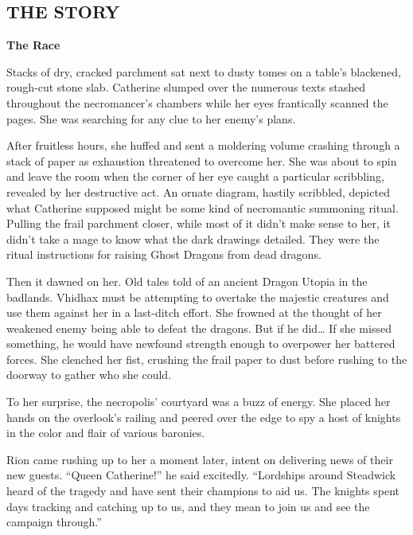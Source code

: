 \newpage

\begin{multicols*}{2}

\subsection*{\MakeUppercase{The story}}

\textbf{The Race}

Stacks of dry, cracked parchment sat next to dusty tomes on a table's blackened, rough-cut stone slab. Catherine slumped over the numerous texts stashed throughout the necromancer's chambers while her eyes frantically scanned the pages. She was searching for any clue to her enemy's plans.

After fruitless hours, she huffed and sent a moldering volume crashing through a stack of paper as exhaustion threatened to overcome her. She was about to spin and leave the room when the corner of her eye caught a particular scribbling, revealed by her destructive act. An ornate diagram, hastily scribbled, depicted what Catherine supposed might be some kind of necromantic summoning ritual. Pulling the frail parchment closer, while most of it didn't make sense to her, it didn't take a mage to know what the dark drawings detailed. They were the ritual instructions for raising Ghost Dragons from dead dragons.

Then it dawned on her. Old tales told of an ancient Dragon Utopia in the badlands. Vhidhax must be attempting to overtake the majestic creatures and use them against her in a last-ditch effort. She frowned at the thought of her weakened enemy being able to defeat the dragons. But if he did… If she missed something, he would have newfound strength enough to overpower her battered forces. She clenched her fist, crushing the frail paper to dust before rushing to the doorway to gather who she could.

To her surprise, the necropolis' courtyard was a buzz of energy. She placed her hands on the overlook's railing and peered over the edge to spy a host of knights in the color and flair of various baronies. 

Rion came rushing up to her a moment later, intent on delivering news of their new guests. ``Queen Catherine!'' he said excitedly. ``Lordships around Steadwick heard of the tragedy and have sent their champions to aid us. The knights spent days tracking and catching up to us, and they mean to join us and see the campaign through.''


\end{multicols*}
